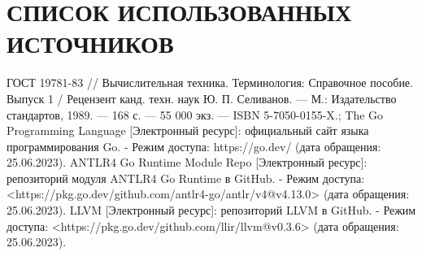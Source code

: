\section*{СПИСОК ИСПОЛЬЗОВАННЫХ ИСТОЧНИКОВ}

\begingroup
\renewcommand{\section}[2]{}
\begin{thebibliography}{}
	 ГОСТ 19781-83 // Вычислительная техника. Терминология: Справочное пособие. Выпуск 1 / Рецензент канд. техн. наук Ю. П. Селиванов. — М.: Издательство стандартов, 1989. — 168 с. — 55 000 экз. — ISBN 5-7050-0155-X.;
	 The Go Programming Language [Электронный ресурс]: официальный сайт языка программирования Go. - Режим доступа: https://go.dev/ (дата обращения: 25.06.2023).
	 ANTLR4 Go Runtime Module Repo [Электронный ресурс]: репозиторий модуля ANTLR4 Go Runtime в GitHub. - Режим доступа: <https://pkg.go.dev/github.com/antlr4-go/antlr/v4@v4.13.0> (дата обращения: 25.06.2023).
	 LLVM [Электронный ресурс]: репозиторий LLVM в GitHub. - Режим доступа: <https://pkg.go.dev/github.com/llir/llvm@v0.3.6> (дата обращения: 25.06.2023).
\end{thebibliography}
\endgroup

\pagebreak